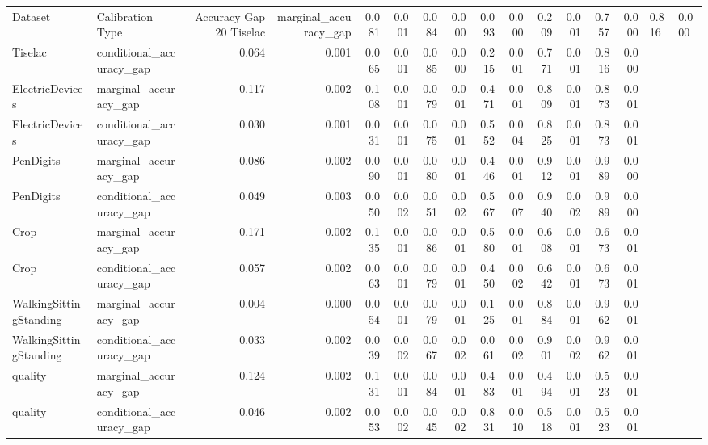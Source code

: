 \begin{tabular}{llrrrrrrrrrrrr}
\toprule
Dataset & Calibration Type & Accuracy Gap 20%
\midrule
Tiselac & marginal_accuracy_gap & 0.081 & 0.001 & 0.084 & 0.000 & 0.093 & 0.000 & 0.209 & 0.001 & 0.757 & 0.000 & 0.816 & 0.000 \\
Tiselac & conditional_accuracy_gap & 0.064 & 0.001 & 0.065 & 0.001 & 0.085 & 0.000 & 0.215 & 0.001 & 0.771 & 0.001 & 0.816 & 0.000 \\
ElectricDevices & marginal_accuracy_gap & 0.117 & 0.002 & 0.108 & 0.001 & 0.079 & 0.001 & 0.471 & 0.001 & 0.809 & 0.001 & 0.873 & 0.001 \\
ElectricDevices & conditional_accuracy_gap & 0.030 & 0.001 & 0.031 & 0.001 & 0.075 & 0.001 & 0.552 & 0.004 & 0.825 & 0.001 & 0.873 & 0.001 \\
PenDigits & marginal_accuracy_gap & 0.086 & 0.002 & 0.090 & 0.001 & 0.080 & 0.001 & 0.446 & 0.001 & 0.912 & 0.001 & 0.989 & 0.000 \\
PenDigits & conditional_accuracy_gap & 0.049 & 0.003 & 0.050 & 0.002 & 0.051 & 0.002 & 0.567 & 0.007 & 0.940 & 0.002 & 0.989 & 0.000 \\
Crop & marginal_accuracy_gap & 0.171 & 0.002 & 0.135 & 0.001 & 0.086 & 0.001 & 0.580 & 0.001 & 0.608 & 0.001 & 0.673 & 0.001 \\
Crop & conditional_accuracy_gap & 0.057 & 0.002 & 0.063 & 0.001 & 0.079 & 0.001 & 0.450 & 0.002 & 0.642 & 0.001 & 0.673 & 0.001 \\
WalkingSittingStanding & marginal_accuracy_gap & 0.004 & 0.000 & 0.054 & 0.001 & 0.079 & 0.001 & 0.125 & 0.001 & 0.884 & 0.001 & 0.962 & 0.001 \\
WalkingSittingStanding & conditional_accuracy_gap & 0.033 & 0.002 & 0.039 & 0.002 & 0.067 & 0.002 & 0.061 & 0.002 & 0.901 & 0.002 & 0.962 & 0.001 \\
quality & marginal_accuracy_gap & 0.124 & 0.002 & 0.131 & 0.001 & 0.084 & 0.001 & 0.483 & 0.001 & 0.494 & 0.001 & 0.523 & 0.001 \\
quality & conditional_accuracy_gap & 0.046 & 0.002 & 0.053 & 0.002 & 0.045 & 0.002 & 0.831 & 0.010 & 0.518 & 0.001 & 0.523 & 0.001 \\
\bottomrule
\end{tabular}
